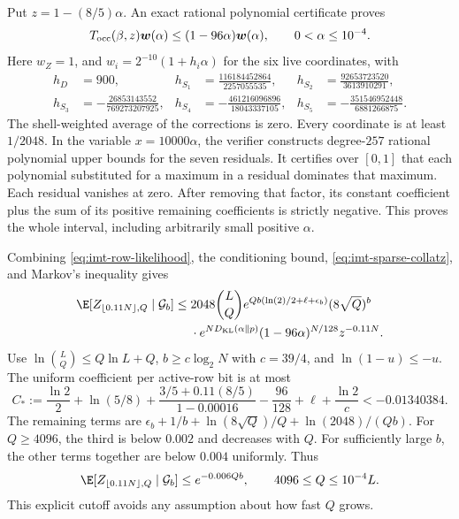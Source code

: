 Put $z=1-(8/5)\alpha$. An exact rational polynomial certificate proves
\begin{equation}
 T_{\rm occ}(\beta,z)\boldsymbol w(\alpha)
 \le (1-96\alpha)\boldsymbol w(\alpha),
 \qquad 0<\alpha\le10^{-4}.
 \label{eq:imt-sparse-collatz}
\end{equation}
Here $w_Z=1$, and $w_i=2^{-10}(1+h_i\alpha)$ for the six live coordinates,
with
\begin{align*}
 h_D&=900,& h_{S_1}&=\frac{116184452864}{2257055535},&
 h_{S_2}&=\frac{92653723520}{3613910291},\\
 h_{S_3}&=-\frac{26853143552}{769273207925},&
 h_{S_4}&=-\frac{461216096896}{18043337105},&
 h_{S_5}&=-\frac{351546952448}{6881266875}.
\end{align*}
The shell-weighted average of the corrections is zero. Every coordinate is
at least $1/2048$. In the variable $x=10000\alpha$, the verifier constructs
degree-$257$ rational polynomial upper bounds for the seven residuals.
It certifies over $[0,1]$ that each polynomial substituted for a maximum
in a residual dominates that maximum. Each residual vanishes
at zero. After removing that factor, its constant coefficient plus the sum
of its positive remaining coefficients is strictly negative. This proves
the whole interval, including arbitrarily small positive $\alpha$.

Combining \eqref{eq:imt-row-likelihood}, the conditioning bound,
\eqref{eq:imt-sparse-collatz}, and Markov's inequality gives
\begin{align}
 \E[Z_{\lfloor0.11N\rfloor,Q}\mid\mathcal G_b]
 \le{}&2048\binom LQ e^{Qb(\ln(2)/2+\ell+\epsilon_b)}(8\sqrt Q)^b
 \nonumber\\*
 &\cdot e^{ND_{\rm KL}(\alpha\Vert p)}
 (1-96\alpha)^{N/128}z^{-0.11N}.
 \label{eq:imt-uniform-sparse}
\end{align}
Use $\ln\binom LQ\le Q\ln L+Q$, $b\ge c\log_2N$ with $c=39/4$, and
$\ln(1-u)\le-u$. The uniform coefficient per active-row bit is at most
\[
 C_*:=\frac{\ln2}{2}+\ln(5/8)
 +\frac{3/5+0.11(8/5)}{1-0.00016}-\frac{96}{128}
 +\ell+\frac{\ln2}{c}<-0.01340384.
\]
The remaining terms are
$\epsilon_b+1/b+\ln(8\sqrt Q)/Q+\ln(2048)/(Qb)$.
For $Q\ge4096$, the third is below $0.002$ and decreases with $Q$.
For sufficiently large $b$, the other terms together are below $0.004$
uniformly. Thus
\begin{equation}
 \E[Z_{\lfloor0.11N\rfloor,Q}\mid\mathcal G_b]
 \le e^{-0.006Qb},\qquad 4096\le Q\le10^{-4}L.
 \label{eq:imt-sparse-final}
\end{equation}
This explicit cutoff avoids any assumption about how fast $Q$ grows.

